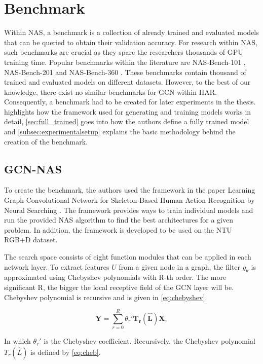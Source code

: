 \section{Benchmark}
Within \gls{NAS}, a benchmark is a collection of already trained and evaluated models that can be queried to obtain their validation accuracy. For research within \gls{NAS}, such benchmarks are crucial as they spare the researchers thousands of \gls{GPU} training time. Popular benchmarks within the literature are NAS-Bench-101 \autocite{ying2019bench}, NAS-Bench-201 \autocite{dong2020bench} and NAS-Bench-360 \autocite{tu2021bench}. These benchmarks contain thousand of trained and evaluated models on different datasets. However, to the best of our knowledge, 
there exist no similar benchmarks for \gls{GCN} within \gls{HAR}. Consequently, a benchmark had to be created for later experiments in the thesis.  highlights how the framework used for generating and training models works in detail, \cref{sec:full_trained} goes into how the authors define a fully trained model and \cref{subsec:experimentalsetup} explains the basic methodology behind the creation of the benchmark.       

\subsection{GCN-NAS}\label{sec:gcn-nas}
To create the benchmark, the authors used the framework in the paper Learning Graph Convolutional Network for Skeleton-Based Human Action Recognition by Neural Searching \autocite{peng2020learning}. The framework provides ways to train individual models and run the provided \gls{NAS} algorithm to find the best architectures for a given problem. In addition, the framework is developed to be used on the NTU RGB+D dataset.  

The search space consists of eight function modules that can be applied in each network layer. To extract features $U$ from a given node in a graph, the filter $g_{\theta}$ is approximated using Chebyshev polynomials with R-th order. The more significant R, the bigger the local receptive field of the \gls{GCN} layer will be. Chebyshev polynomial is recursive and is given in \cref{eq:chebyshev}. 

\begin{equation}
    \bm{Y} = \sum^R_{r=0} \theta_r' \bm{T_r} (\bm{\hat{L}})\bm{X},
    \label{eq:chebyshev}
\end{equation}

In which $ \theta_r'$ is the Chebyshev coefficient. Recursively, the Chebyshev polynomial $T_r(\hat{L})$ is defined by \cref{eq:cheb}. 

